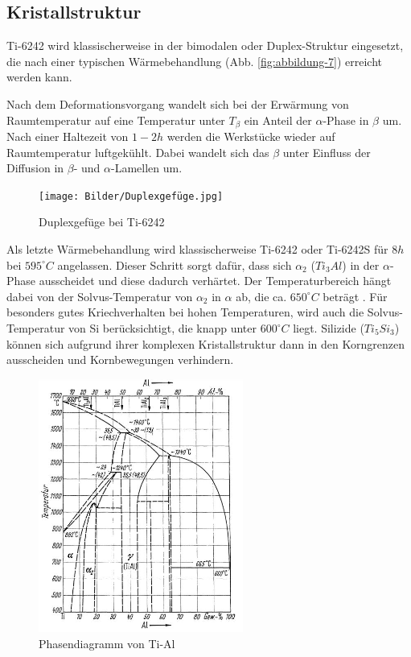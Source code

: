 
\subsection{Kristallstruktur}

Ti-6242 wird klassischerweise in der bimodalen oder Duplex-Struktur eingesetzt, die nach einer typischen Wärmebehandlung (Abb. \ref{fig:abbildung-7}) erreicht werden kann.

Nach dem Deformationsvorgang wandelt sich bei der Erwärmung von Raumtemperatur  auf eine Temperatur unter $T_{\beta}$  ein Anteil der $\alpha$-Phase in $\beta$ um. Nach einer Haltezeit von $1-2h$ werden die Werkstücke wieder auf Raumtemperatur luftgekühlt.
Dabei wandelt sich das $\beta$ unter Einfluss der Diffusion in $\beta$- und $\alpha$-Lamellen um.

\begin{figure}[H]
	\centering
	\texttt{[image: Bilder/Duplexgefüge.jpg]}
	\caption{Duplexgefüge bei Ti-6242}
	\label{fig:L.M}
\end{figure}


Als letzte Wärmebehandlung wird klassischerweise  Ti-6242 oder Ti-6242S für  $8 h$ bei $595^\circ C$ angelassen. Dieser Schritt sorgt dafür, dass sich $\alpha_2$ ($Ti_3Al$) in der $\alpha$-Phase ausscheidet und diese dadurch verhärtet. Der Temperaturbereich hängt dabei von der Solvus-Temperatur von $\alpha_2$ in $\alpha$ ab, die ca. $650^\circ C$ beträgt \cite{Lutjering.2007}.
Für besonders gutes Kriechverhalten bei hohen Temperaturen, wird auch die Solvus-Temperatur von Si berücksichtigt, die knapp unter $600^\circ C$ liegt. Silizide ($Ti_5Si_3$) können sich aufgrund ihrer komplexen Kristallstruktur dann in den Korngrenzen ausscheiden und Kornbewegungen verhindern.

\begin{figure}[H]
	\centering
	\includegraphics[width=0.6\textwidth]{Bilder/TiAl}
	\caption{Phasendiagramm von Ti-Al \cite{Zwicker.2014}}
	\label{fig:PD_tial}
\end{figure}

